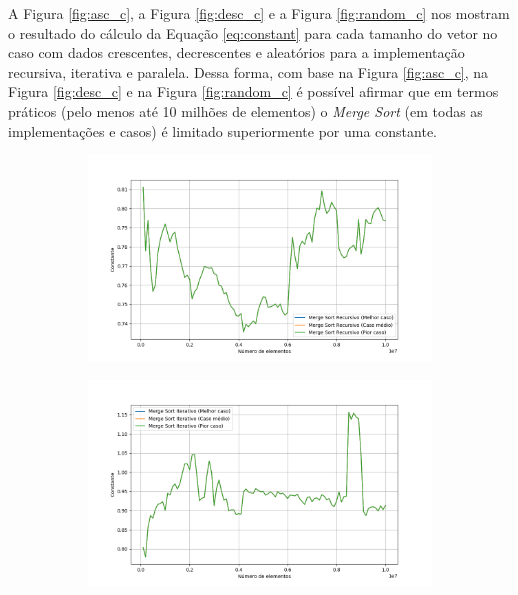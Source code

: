 \documentclass[12pt]{article}
\begin{document}
A Figura \ref{fig:asc_c}, a Figura \ref{fig:desc_c} e a Figura \ref{fig:random_c} nos mostram o resultado do cálculo da Equação \ref{eq:constant} para cada tamanho do vetor no caso com dados crescentes, decrescentes e aleatórios para a implementação recursiva, iterativa e paralela. Dessa forma, com base na Figura \ref{fig:asc_c}, na Figura \ref{fig:desc_c} e na Figura \ref{fig:random_c} é possível afirmar que em termos práticos (pelo menos até 10 milhões de elementos) o \textit{Merge Sort} (em todas as implementações e casos) é limitado superiormente por uma constante.

\begin{figure}[H]
    \caption{Constante do Merge Sort com dados crescentes}
    \centering
    \begin{subfigure}{0.49\textwidth}
        \centering
        \includegraphics[width=\linewidth]{complexity_ascending_recursive_mergesort.png}
        \label{fig:imagem1}
    \end{subfigure}
    \hfill
    \begin{subfigure}{0.49\textwidth}
        \centering
        \includegraphics[width=\linewidth]{complexity_ascending_iterative_mergesort.png}

\end{subfigure}
\end{figure}
\end{document}
